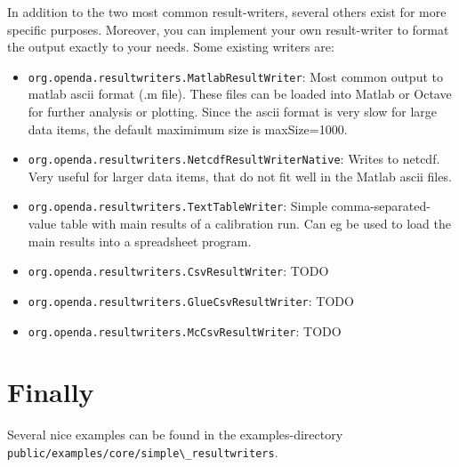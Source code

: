 In addition to the two most common result-writers, several others exist for
more specific purposes. Moreover, you can implement your own result-writer to
format the output exactly to your needs. Some existing writers are:
\begin{itemize}
\item {\tt org.openda.resultwriters.MatlabResultWriter}: Most common output to
matlab ascii format (.m file). These files can be loaded into Matlab or Octave
for further analysis or plotting. Since the ascii format is very slow for large
data items, the default maximimum size is maxSize=1000.
\item {\tt org.openda.resultwriters.NetcdfResultWriterNative}: Writes to netcdf.
Very useful for larger data items, that do not fit well in the Matlab ascii
files.
\item {\tt org.openda.resultwriters.TextTableWriter}: Simple
comma-separated-value table with main results of a calibration run. Can eg be
used to load the main results into a spreadsheet program.
\item {\tt org.openda.resultwriters.CsvResultWriter}: TODO
\item {\tt org.openda.resultwriters.GlueCsvResultWriter}: TODO
\item {\tt org.openda.resultwriters.McCsvResultWriter}: TODO
\end{itemize}

\section{Finally}

Several nice examples can be found in the examples-directory\\
\verb|public/examples/core/simple\_resultwriters|.
